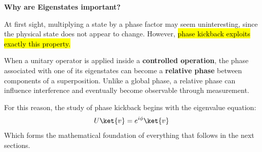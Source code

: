 \highspace
\begin{flushleft}
    \textcolor{Green3}{ \textbf{Why are Eigenstates important?}}
\end{flushleft}
At first sight, multiplying a state by a phase factor may seem uninteresting, since the physical state does not appear to change. However, \hl{phase kickback exploits exactly this property.}

\highspace
When a unitary operator is applied inside a \textbf{controlled operation}, the phase associated with one of its eigenstates can become a \textbf{relative phase} between components of a superposition. Unlike a global phase, a relative phase can influence interference and eventually become observable through measurement.

\highspace
For this reason, the study of phase kickback begins with the eigenvalue equation:
\begin{equation*}
    U\ket{v} = e^{i\phi}\ket{v}
\end{equation*}
Which forms the mathematical foundation of everything that follows in the next sections.